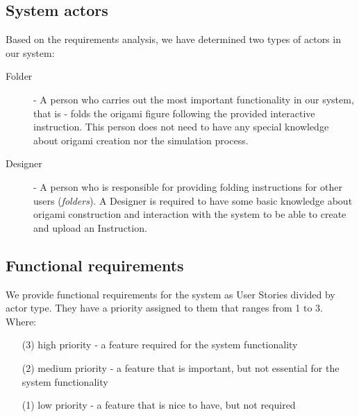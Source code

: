 \subsection{System actors}

Based on the requirements analysis, we have determined two types of actors in our system:

\begin{description}
	\item[Folder] \label{actors:folder} - A person who carries out the most important functionality in our system,
		that is - folds the origami figure following the provided interactive instruction.
		This person does not need to have any special knowledge about origami creation nor the simulation process.
	\item[Designer] \label{actors:designer} - A person who is responsible for providing folding instructions
		for other users (\textit{folders}).
		A Designer is required to have some basic knowledge about origami construction
		and interaction with the system to be able to create and upload an Instruction.
\end{description}

\newcommand{\requirement}[2]{\item #2. (#1)}
\subsection{Functional requirements}
\label{section:functional-requirements}

We provide functional requirements for the system as User Stories divided by actor type.
They have a priority assigned to them that ranges from 1 to 3. Where:

\begin{enumerate}
	\item[(3)] high priority - a feature required for the system functionality 
	\item[(2)] medium priority - a feature that is important, but not essential for the system functionality
	\item[(1)] low priority - a feature that is nice to have, but not required 
\end{enumerate}

